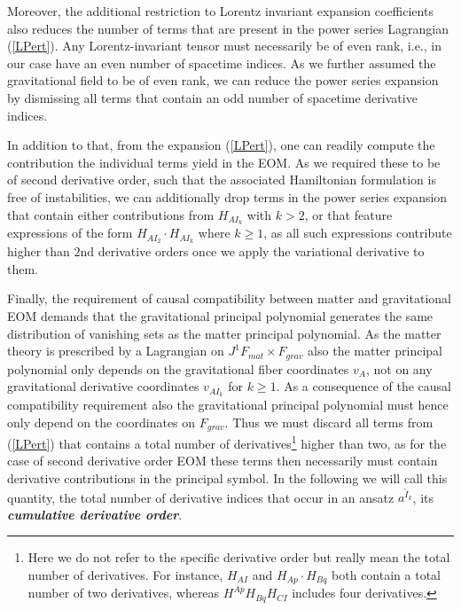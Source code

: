 Moreover, the additional restriction to Lorentz invariant expansion coefficients also reduces the number of terms that are present in the power series Lagrangian (\ref{LPert}). Any Lorentz-invariant tensor must necessarily be of even rank, i.e., in our case have an even number of spacetime indices. As we further assumed the gravitational field to be of even rank, we can reduce the power series expansion by dismissing all terms that contain an odd number of spacetime derivative indices.

In addition to that, from the expansion (\ref{LPert}), one can readily compute the contribution the individual terms yield in the EOM.  As we required these to be of second derivative order, such that the associated Hamiltonian formulation is free of instabilities, we can additionally drop terms in the power series expansion that contain either contributions from $H_{AI_k}$ with $k>2$, or that feature expressions of the form $H_{AI_2}\cdot H_{AI_k}$ where $k\geq 1$, as all such expressions contribute higher than $2$nd derivative orders once we apply the variational derivative to them.

Finally, the requirement of causal compatibility between matter and gravitational EOM demands that the gravitational principal polynomial generates the same distribution of vanishing sets as the matter principal polynomial. As the matter theory is prescribed by a Lagrangian on $J^1F_{mat} \times F_{grav}$ also the matter principal polynomial only depends on the gravitational fiber coordinates $v_A$, not on any gravitational derivative coordinates $v_{AI_k}$ for $k\geq 1$.
As a consequence of the causal compatibility requirement also the gravitational principal polynomial must hence only depend on the coordinates on $F_{grav}$. Thus we must discard all terms from (\ref{LPert}) that contains a total number of derivatives\footnote{Here we do not refer to the specific derivative order but really mean the total number of derivatives. For instance, $H_{AI}$ and $H_{Ap} \cdot H_{Bq}$ both contain a total number of two derivatives, whereas $H^{Ap}H_{Bq}H_{CI}$ includes four derivatives.} higher than two, as for the case of second derivative order EOM these terms then necessarily must contain derivative contributions in the principal symbol.
In the following we will call this quantity, the total number of derivative indices that occur in an ansatz $a^{\tilde{I}_k}$, its \textit{\textbf{cumulative derivative order}}.  


